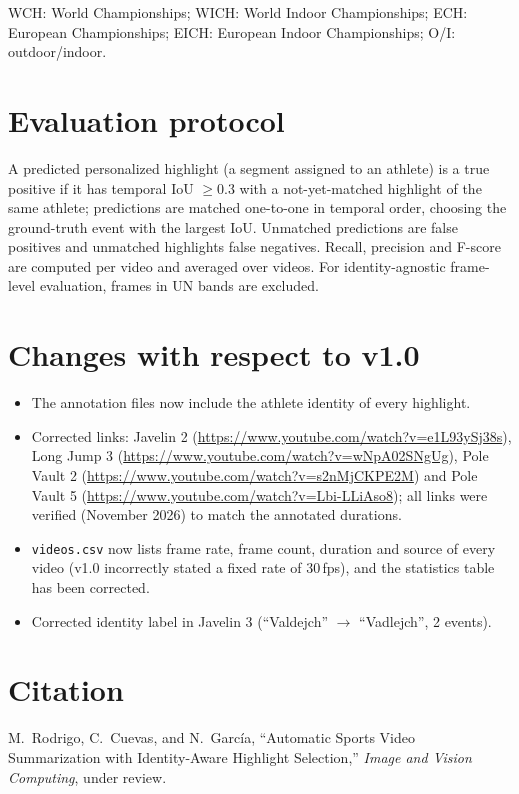 \documentclass[11pt,a4paper]{article}
\begin{document}
WCH: World Championships; WICH: World Indoor Championships; ECH: European Championships; EICH: European Indoor Championships; O/I: outdoor/indoor.

\section*{Evaluation protocol}
A predicted personalized highlight (a segment assigned to an athlete) is a true positive if it has temporal IoU $\geq0.3$ with a not-yet-matched highlight of the same athlete; predictions are matched one-to-one in temporal order, choosing the ground-truth event with the largest IoU. Unmatched predictions are false positives and unmatched highlights false negatives. Recall, precision and F-score are computed per video and averaged over videos. For identity-agnostic frame-level evaluation, frames in UN bands are excluded.

\section*{Changes with respect to v1.0}
\begin{itemize}
\item The annotation files now include the athlete identity of every highlight.
\item Corrected links: Javelin 2 (\url{https://www.youtube.com/watch?v=e1L93ySj38s}), Long Jump 3 (\url{https://www.youtube.com/watch?v=wNpA02SNgUg}), Pole Vault 2 (\url{https://www.youtube.com/watch?v=s2nMjCKPE2M}) and Pole Vault 5 (\url{https://www.youtube.com/watch?v=Lbi-LLiAso8}); all links were verified (November 2026) to match the annotated durations.
\item \texttt{videos.csv} now lists frame rate, frame count, duration and source of every video (v1.0 incorrectly stated a fixed rate of 30\,fps), and the statistics table has been corrected.
\item Corrected identity label in Javelin 3 (``Valdejch'' $\rightarrow$ ``Vadlejch'', 2 events).
\end{itemize}

\section*{Citation}
M.~Rodrigo, C.~Cuevas, and N.~Garc\'{i}a, ``Automatic Sports Video Summarization with Identity-Aware Highlight Selection,'' \emph{Image and Vision Computing}, under review.
\end{document}
